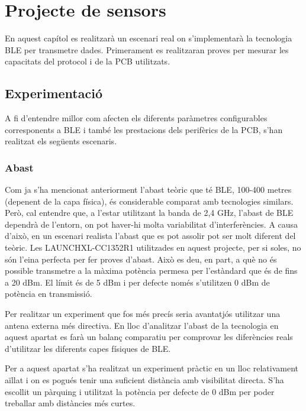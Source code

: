 \chapter{Projecte de sensors}
En aquest capítol es realitzarà un escenari real on s'implementarà la tecnologia BLE per transmetre dades.
Primerament es realitzaran proves per mesurar les capacitats del protocol i de la PCB utilitzats.

\section{Experimentació}
A fi d'entendre millor com afecten els diferents paràmetres configurables corresponents a BLE i també les prestacions dels perifèrics de la PCB, s'han realitzat els següents escenaris.


\subsection{Abast}

Com ja s'ha mencionat anteriorment l'abast teòric que té BLE, 100-400 metres (depenent de la capa física), és considerable comparat amb tecnologies similars.
Però, cal entendre que, a l'estar utilitzant la banda de 2,4 GHz, l'abast de BLE dependrà de l'entorn, on pot haver-hi molta variabilitat d'interferències.
A causa d'això, en un escenari realista l'abast que es pot assolir pot ser molt diferent del teòric.
Les LAUNCHXL-CC1352R1 utilitzades en aquest projecte, per si soles, no són l'eina perfecta per fer proves d'abast.
Això es deu, en part, a què no és possible transmetre a la màxima potència permesa per l'estàndard que és de fins a 20 dBm.
El límit és de 5 dBm i per defecte només s'utilitzen 0 dBm de potència en transmissió.

Per realitzar un experiment que fos més precís seria avantatjós utilitzar una antena externa més directiva.
En lloc d'analitzar l'abast de la tecnologia en aquest apartat es farà un balanç comparatiu per comprovar les diferències reals d'utilitzar les diferents capes físiques de BLE.

Per a aquest apartat s'ha realitzat un experiment pràctic en un lloc relativament aïllat i on es pogués tenir una suficient distància amb visibilitat directa.
S'ha escollit un pàrquing i utilitzat la potència per defecte de 0 dBm per poder treballar amb distàncies més curtes.

